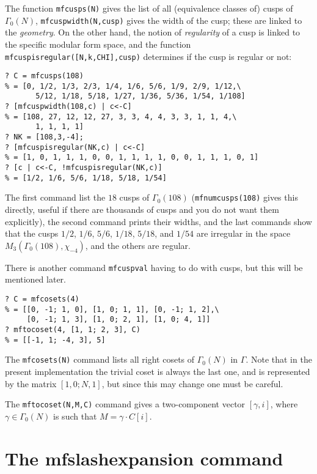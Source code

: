 \documentclass[11pt]{article}
\newcommand{\ga}{\gamma}
\newcommand{\G}{\Gamma}
\def\kbd#1{{\tt #1}}
\begin{document}
The function \kbd{mfcusps(N)} gives the list of all (equivalence classes of)
cusps of $\G_0(N)$, \kbd{mfcuspwidth(N,cusp)} gives the width of the cusp;
these are linked to the \emph{geometry}. On the other hand, the notion
of \emph{regularity} of a cusp is linked to the specific modular form space,
and the function \kbd{mfcuspisregular([N,k,CHI],cusp)} determines if the cusp
is regular or not:

\begin{verbatim}
? C = mfcusps(108)
% = [0, 1/2, 1/3, 2/3, 1/4, 1/6, 5/6, 1/9, 2/9, 1/12,\
       5/12, 1/18, 5/18, 1/27, 1/36, 5/36, 1/54, 1/108]
? [mfcuspwidth(108,c) | c<-C]
% = [108, 27, 12, 12, 27, 3, 3, 4, 4, 3, 3, 1, 1, 4,\
       1, 1, 1, 1]
? NK = [108,3,-4];
? [mfcuspisregular(NK,c) | c<-C]
% = [1, 0, 1, 1, 1, 0, 0, 1, 1, 1, 1, 0, 0, 1, 1, 1, 0, 1]
? [c | c<-C, !mfcuspisregular(NK,c)]
% = [1/2, 1/6, 5/6, 1/18, 5/18, 1/54]
\end{verbatim}

The first command list the $18$ cusps of $\G_0(108)$ (\kbd{mfnumcusps(108)}
gives this directly, useful if there are thousands of cusps and you do not
want them explicitly), the second command prints their widths, and the last
commands show that the cusps $1/2$, $1/6$, $5/6$, $1/18$, $5/18$, and $1/54$
are irregular in the space $M_3(\G_0(108),\chi_{-4})$, and the others are
regular.

There is another command \kbd{mfcuspval} having to do with cusps, but this
will be mentioned later.

\medskip

\begin{verbatim}
? C = mfcosets(4)
% = [[0, -1; 1, 0], [1, 0; 1, 1], [0, -1; 1, 2],\
     [0, -1; 1, 3], [1, 0; 2, 1], [1, 0; 4, 1]]
? mftocoset(4, [1, 1; 2, 3], C)
% = [[-1, 1; -4, 3], 5]
\end{verbatim}

   The \kbd{mfcosets(N)} command lists all right cosets of $\G_0(N)$ in $\G$.
   Note that in the present implementation the trivial coset is always the
   last one, and is represented by the matrix $[1,0;N,1]$, but since this
   may change one must be careful.

   The \kbd{mftocoset(N,M,C)} command gives a two-component
   vector $[\ga,i]$, where $\ga\in\G_0(N)$ is such that $M=\ga\cdot C[i]$.

\section{The mfslashexpansion command}
\end{document}
